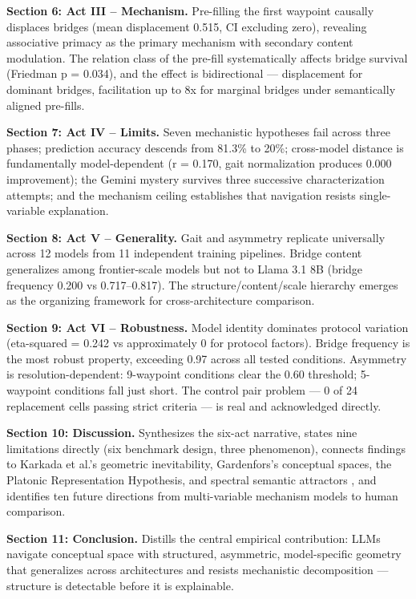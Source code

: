 \textbf{Section 6: Act III -- Mechanism.} Pre-filling the first waypoint causally displaces bridges (mean displacement 0.515, CI excluding zero), revealing associative primacy as the primary mechanism with secondary content modulation. The relation class of the pre-fill systematically affects bridge survival (Friedman p = 0.034), and the effect is bidirectional --- displacement for dominant bridges, facilitation up to 8x for marginal bridges under semantically aligned pre-fills.

\textbf{Section 7: Act IV -- Limits.} Seven mechanistic hypotheses fail across three phases; prediction accuracy descends from 81.3\% to 20\%; cross-model distance is fundamentally model-dependent (r = 0.170, gait normalization produces 0.000 improvement); the Gemini mystery survives three successive characterization attempts; and the mechanism ceiling establishes that navigation resists single-variable explanation.

\textbf{Section 8: Act V -- Generality.} Gait and asymmetry replicate universally across 12 models from 11 independent training pipelines. Bridge content generalizes among frontier-scale models but not to Llama 3.1 8B (bridge frequency 0.200 vs 0.717--0.817). The structure/content/scale hierarchy emerges as the organizing framework for cross-architecture comparison.

\textbf{Section 9: Act VI -- Robustness.} Model identity dominates protocol variation (eta-squared = 0.242 vs approximately 0 for protocol factors). Bridge frequency is the most robust property, exceeding 0.97 across all tested conditions. Asymmetry is resolution-dependent: 9-waypoint conditions clear the 0.60 threshold; 5-waypoint conditions fall just short. The control pair problem --- 0 of 24 replacement cells passing strict criteria --- is real and acknowledged directly.

\textbf{Section 10: Discussion.} Synthesizes the six-act narrative, states nine limitations directly (six benchmark design, three phenomenon), connects findings to Karkada et al.'s geometric inevitability, Gardenfors's conceptual spaces, the Platonic Representation Hypothesis, and spectral semantic attractors \citep{wyss2025spectral}, and identifies ten future directions from multi-variable mechanism models to human comparison.

\textbf{Section 11: Conclusion.} Distills the central empirical contribution: LLMs navigate conceptual space with structured, asymmetric, model-specific geometry that generalizes across architectures and resists mechanistic decomposition --- structure is detectable before it is explainable.
